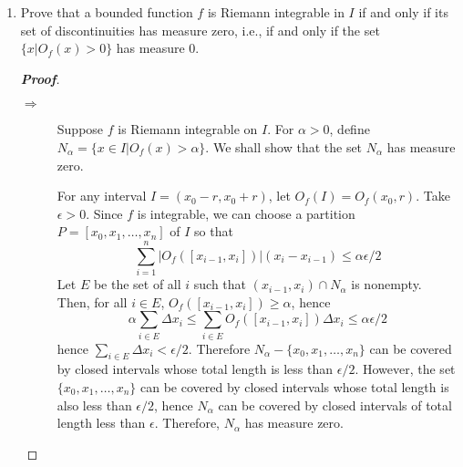 \documentclass[12pt,leqno]{book}
\theoremstyle{definition}
\newenvironment{Proof}{\begin{proof}[\textnormal{\textbf{Proof}}]}{\end{proof}}
\begin{document}
\begin{enumerate}
\begin{Proof}
\begin{enumerate}
\begin{description}
	 \item [$\Leftarrow$] On the other hand, if $O_f(x_0)=0$, then for every $\epsilon>0$ there is a $\delta>0$ such that \[\sup_{y,z\in(x_0-\delta,x_0+\delta)}|f(y)-f(z)|<\epsilon\] So, in particular, there is a $\delta>0$ such that, if $|x-x_0|<\delta$, then $|f(x)-f(x_0)|<\epsilon$. Thus $f$ is continuous at $x_0$.
        \end{description}
 \end{enumerate}
\end{Proof}
\item Prove that a bounded function $f$ is Riemann integrable in $I$ if and only if its set of discontinuities has measure zero, i.e., if and only if the set $\{x|O_f(x)>0\}$ has measure 0.
\begin{Proof}
 \begin{description}
  \item [$\Rightarrow$] Suppose $f$ is Riemann integrable on $I$. For $\alpha>0$, define $N_{\alpha}=\{x\in I|O_f(x)>\alpha\}$. We shall show that the set $N_{\alpha}$ has measure zero.

For any interval $I=(x_0-r,x_0+r)$, let $O_f(I)=O_f(x_0,r)$. Take $\epsilon>0$. Since $f$ is integrable, we can choose a partition $P=[x_0,x_1,\hdots,x_n]$ of $I$ so that \[\sum_{i=1}^n|O_f([x_{i-1},x_i])|(x_i-x_{i-1})\leq\alpha\epsilon/2\] Let $E$ be the set of all $i$ such that $(x_{i-1},x_i)\cap N_{\alpha}$ is nonempty. Then, for all $i\in E$, $O_f([x_{i-1},x_i])\geq\alpha$, hence \[\alpha\sum_{i\in E}\Delta x_i\leq\sum_{i\in E}O_f([x_{i-1},x_i])\Delta x_i\leq\alpha\epsilon/2\] hence $\sum_{i\in E}\Delta x_i<\epsilon/2$. Therefore $N_{\alpha}-\{x_0,x_1,\hdots,x_n\}$ can be covered by closed intervals whose total length is less than $\epsilon/2$. However, the set $\{x_0,x_1,\hdots,x_n\}$ can be covered by closed intervals whose total length is also less than $\epsilon/2$, hence $N_{\alpha}$ can be covered by closed intervals of total length less than $\epsilon$. Therefore, $N_{\alpha}$ has measure zero.


\end{description}
\end{Proof}
\end{enumerate}
\end{document}
